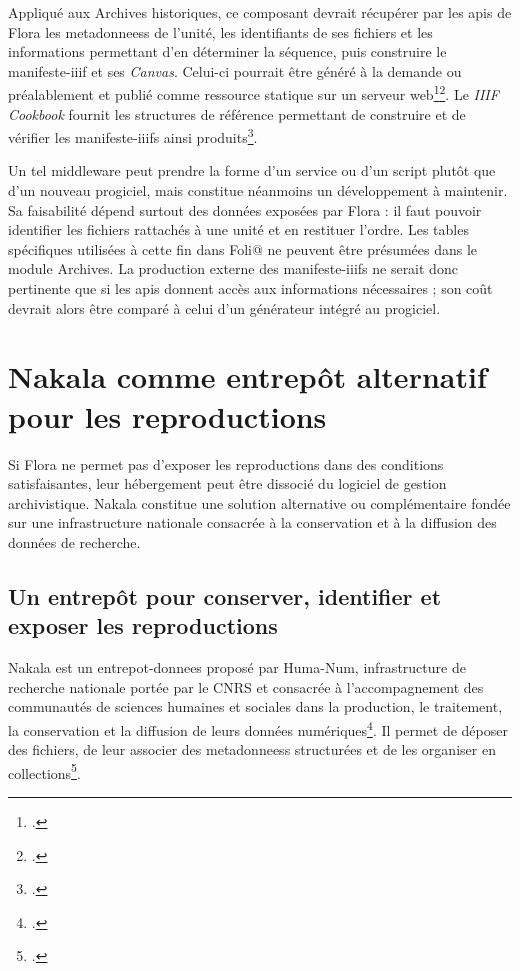 Appliqué aux Archives historiques, ce composant devrait récupérer par les \glspl{api} de Flora les \glspl{metadonnees} de l'unité, les identifiants de ses fichiers et les informations permettant d'en déterminer la séquence, puis construire le \gls{manifeste-iiif} et ses \emph{Canvas}. Celui-ci pourrait être généré à la demande ou préalablement et publié comme ressource statique sur un serveur web\footcite{BiblissimaIIIFImplementation}\footcite{IIIFManifestGeneration}. Le \emph{IIIF Cookbook} fournit les structures de référence permettant de construire et de vérifier les \glspl{manifeste-iiif} ainsi produits\footcite{IIIFCookbook}.

Un tel \gls{middleware} peut prendre la forme d'un service ou d'un script plutôt que d'un nouveau progiciel, mais constitue néanmoins un développement à maintenir. Sa faisabilité dépend surtout des données exposées par Flora : il faut pouvoir identifier les fichiers rattachés à une unité et en restituer l'ordre. Les tables spécifiques utilisées à cette fin dans Foli@ ne peuvent être présumées dans le module Archives. La production externe des \glspl{manifeste-iiif} ne serait donc pertinente que si les \glspl{api} donnent accès aux informations nécessaires ; son coût devrait alors être comparé à celui d'un générateur intégré au progiciel.


\section{Nakala comme entrepôt alternatif pour les reproductions}
\label{sec:nakala-reproductions}

Si Flora ne permet pas d'exposer les reproductions dans des conditions satisfaisantes, leur hébergement peut être dissocié du logiciel de gestion archivistique. Nakala constitue une solution alternative ou complémentaire fondée sur une infrastructure nationale consacrée à la conservation et à la diffusion des données de recherche.


\subsection{Un entrepôt pour conserver, identifier et exposer les reproductions}

Nakala est un \gls{entrepot-donnees} proposé par Huma-Num, infrastructure de recherche nationale portée par le CNRS et consacrée à l'accompagnement des communautés de sciences humaines et sociales dans la production, le traitement, la conservation et la diffusion de leurs données numériques\footcite{HumaNumPresentation}. Il permet de déposer des fichiers, de leur associer des \glspl{metadonnees} structurées et de les organiser en collections\footcite{LeFournerPerretNakala}.

